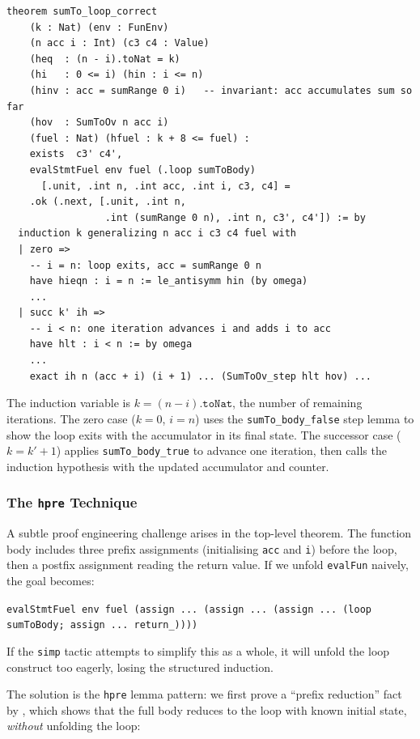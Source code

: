 \begin{lstlisting}[caption={sumTo_loop_correct: inductive invariant.},label={lst:sumtolc}]
theorem sumTo_loop_correct
    (k : Nat) (env : FunEnv)
    (n acc i : Int) (c3 c4 : Value)
    (heq  : (n - i).toNat = k)
    (hi   : 0 <= i) (hin : i <= n)
    (hinv : acc = sumRange 0 i)   -- invariant: acc accumulates sum so far
    (hov  : SumToOv n acc i)
    (fuel : Nat) (hfuel : k + 8 <= fuel) :
    exists  c3' c4',
    evalStmtFuel env fuel (.loop sumToBody)
      [.unit, .int n, .int acc, .int i, c3, c4] =
    .ok (.next, [.unit, .int n,
                 .int (sumRange 0 n), .int n, c3', c4']) := by
  induction k generalizing n acc i c3 c4 fuel with
  | zero =>
    -- i = n: loop exits, acc = sumRange 0 n
    have hieqn : i = n := le_antisymm hin (by omega)
    ...
  | succ k' ih =>
    -- i < n: one iteration advances i and adds i to acc
    have hlt : i < n := by omega
    ...
    exact ih n (acc + i) (i + 1) ... (SumToOv_step hlt hov) ...
\end{lstlisting}

The induction variable is $k = (n - i).\texttt{toNat}$, the number of
remaining iterations. The zero case ($k = 0$, \ie $i = n$) uses the
\texttt{sumTo\_body\_false} step lemma to show the loop exits with the
accumulator in its final state. The successor case ($k = k' + 1$) applies
\texttt{sumTo\_body\_true} to advance one iteration, then calls the
induction hypothesis with the updated accumulator and counter.

\subsubsection{The \texttt{hpre} Technique}

A subtle proof engineering challenge arises in the top-level theorem. The
function body includes three prefix assignments (initialising \texttt{acc} and
\texttt{i}) before the loop, then a postfix assignment reading the return value.
If we unfold \texttt{evalFun} naively, the goal becomes:

\begin{center}
\small\texttt{evalStmtFuel env fuel (assign ... (assign ... (assign ... (loop sumToBody; assign ... return\_))))}
\end{center}

If the \texttt{simp} tactic attempts to simplify this as a whole, it will
unfold the loop construct too eagerly, losing the structured induction.

The solution is the \texttt{hpre} lemma pattern: we first prove a
``prefix reduction'' fact by \rfl, which shows that the full body reduces to
the loop with known initial state, \emph{without} unfolding the loop:

